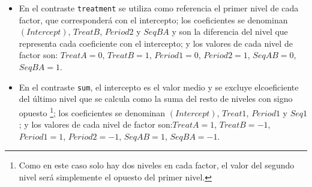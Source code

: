 \documentclass[
  12pt,
  a4paper,
  extrafontsizes,
  onecolumn,
  openright,
  table]{memoir}
\begin{document}
\begin{itemize}
\item
  En el contraste \texttt{treatment} se utiliza como referencia el
  primer nivel de cada factor, que corresponderá con el intercepto; los
  coeficientes se denominan \((Intercept)\), \(TreatB\), \(Period2\) y
  \(SeqBA\) y son la diferencia del nivel que representa cada
  coeficiente con el intercepto; y los valores de cada nivel de factor
  son: \(TreatA = 0\), \(TreatB = 1\), \(Period1 = 0\), \(Period2 = 1\),
  \(SeqAB = 0\), \(SeqBA = 1\).
\item
  En el contraste \texttt{sum}, el intercepto es el valor medio y se
  excluye elcoeficiente del último nivel que se calcula como la suma del
  resto de niveles con signo opuesto \footnote{Como en este caso solo
    hay dos niveles en cada factor, el valor del segundo nivel será
    simplemente el opuesto del primer nivel.}; los coeficientes se
  denominan \((Intercept)\), \(Treat1\), \(Period1\) y \(Seq1\); y los
  valores de cada nivel de factor son:\(TreatA = 1\), \(TreatB = -1\),
  \(Period1 = 1\), \(Period2 = -1\), \(SeqAB = 1\), \(SeqBA = -1\).
\end{itemize}
\end{document}
